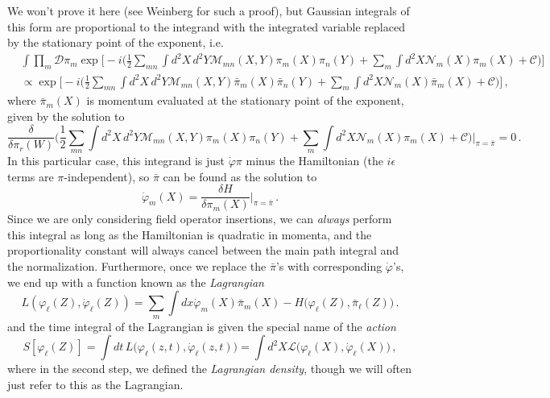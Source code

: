 \documentclass{article}
\numberwithin{equation}{subsection}
\begin{document}
We won't prove it here (see Weinberg for such a proof), but Gaussian integrals of this form are proportional to the integrand with the integrated variable replaced by the 
stationary point of the exponent, i.e.
\begin{equation}\label{eq:gaussPathInt}
    \begin{split}
        &\int\prod_m\mathcal{D}\pi_m \exp\Bigg[-i\Bigg(\frac{1}{2}\sum_{mn}\int d^2X\,d^2Y\mathcal{M}_{mn}(X,Y)\pi_m(X)\pi_n(Y) + \sum_m\int d^2X\mathcal{N}_m(X)\pi_m(X) + \mathcal{C}\Bigg)\Bigg]\\[0.5em]
        &\propto \exp\Bigg[-i\Bigg(\frac{1}{2}\sum_{mn}\int d^2X\,d^2Y\mathcal{M}_{mn}(X,Y)\bar{\pi}_m(X)\bar{\pi}_n(Y) + \sum_m\int d^2X\mathcal{N}_m(X)\bar{\pi}_m(X) + \mathcal{C}\Bigg)\Bigg]\,,
    \end{split}
\end{equation}
where $\bar{\pi}_m(X)$ is momentum evaluated at the stationary point of the exponent, given by the solution to
\begin{equation}
    \frac{\delta}{\delta \pi_r(W)}\Bigg(\frac{1}{2}\sum_{mn}\int d^2X\,d^2Y\mathcal{M}_{mn}(X,Y)\pi_m(X)\pi_n(Y) + \sum_m\int d^2X\mathcal{N}_m(X)\pi_m(X) + \mathcal{C}\Bigg)\Big|_{\pi = \bar{\pi}} = 0\,.
\end{equation}
In this particular case, this integrand is just $\dot\varphi\pi$ minus the Hamiltonian (the $i\epsilon$ terms are $\pi$-independent), so $\bar{\pi}$ can be found as the solution to
\begin{equation}
    \dot{\varphi}_m(X) = \frac{\delta H}{\delta \pi_m(X)}\Big|_{\pi = \bar{\pi}}\,.
\end{equation}
Since we are only considering field operator insertions, we can \textit{always} perform this integral as long as the Hamiltonian is quadratic in momenta, and the proportionality 
constant will always cancel between the main path integral and the normalization. Furthermore, once we replace the $\bar{\pi}$'s with corresponding $\dot{\varphi}$'s, 
we end up with a function known as the \textit{Lagrangian}
\begin{equation}
    L(\varphi_\ell(Z),\dot{\varphi}_\ell(Z)) = \sum_m\int dx\dot{\varphi}_m(X)\bar{\pi}_m(X) - H\big(\varphi_\ell(Z), \bar{\pi}_\ell(Z)\big)\,.
\end{equation}
and the time integral of the Lagrangian is given the special name of the \textit{action}
\begin{equation}
    S[\varphi_\ell(Z)] = \int dt\,L\big(\varphi_\ell(z,t), \dot{\varphi}_\ell(z,t)\big) = \int d^2X\mathcal{L}\big(\varphi_\ell(X), \dot{\varphi}_\ell(X)\big)\,,
\end{equation}
where in the second step, we defined the \textit{Lagrangian density}, though we will often just refer to this as the Lagrangian.
\end{document}
